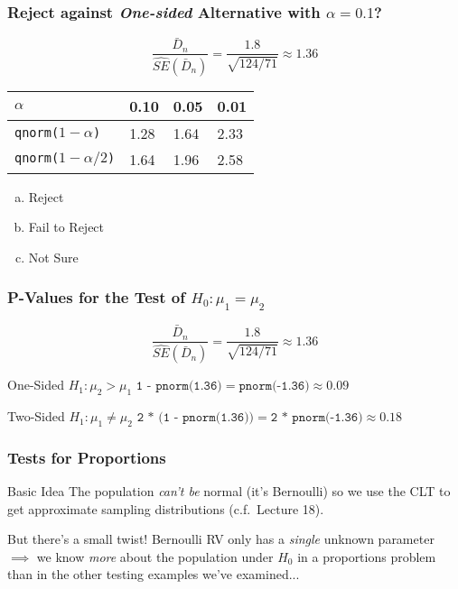 \documentclass{beamer}
\begin{document}
\begin{frame}
\frametitle{Reject against \emph{One-sided} Alternative with $\alpha = 0.1$?  }

	$$\boxed{\displaystyle \frac{\bar{D}_n}{\widehat{SE}(\bar{D}_n)}= \frac{1.8}{\sqrt{124/71}} \approx 1.36} $$

\begin{center}
\begin{tabular}{l|lll}
$\alpha$ &   0.10& 0.05 &0.01\\
\hline
\texttt{qnorm($1-\alpha$)} & 1.28 &1.64 &2.33\\
\texttt{qnorm($1-\alpha/2$)} &1.64 &1.96& 2.58
\end{tabular}
\end{center}

\begin{enumerate}[(a)]
\item Reject
\item Fail to Reject
\item Not Sure
\end{enumerate}



\end{frame}

\begin{frame}
\frametitle{P-Values for the Test of $H_0\colon \mu_1 = \mu_2$}

	$$\boxed{\displaystyle \frac{\bar{D}_n}{\widehat{SE}(\bar{D}_n)}= \frac{1.8}{\sqrt{124/71}} \approx 1.36} $$

\begin{block}{One-Sided $H_1\colon \mu_2 > \mu_1 $} 
$\texttt{1 - pnorm(1.36)} =  \texttt{pnorm(-1.36)}  \approx 0.09$ 
\end{block}

\begin{block}{Two-Sided $H_1 \colon \mu_1 \neq \mu_2$} 
$\texttt{2 * (1 - pnorm(1.36))} =  \texttt{2 * pnorm(-1.36)} \approx 0.18$
\end{block}
\end{frame}
\begin{frame}
	\frametitle{Tests for Proportions}
	\begin{block}
		{Basic Idea}
		The population \emph{can't be} normal (it's Bernoulli) so we use the CLT to get approximate sampling distributions (c.f.\ Lecture 18).
	\end{block}
	\begin{block}
		{But there's a small twist!}
		Bernoulli RV only has a \emph{single} unknown parameter $\implies$  we know \emph{more} about the population under $H_0$ in a proportions problem than in the other testing examples we've examined...	
	\end{block}

\vspace{1em}	

	\hfill\alert{}
\end{frame}
\end{document}
